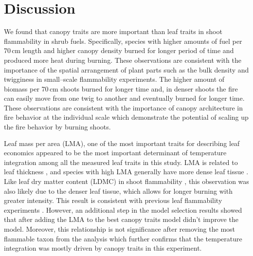 \documentclass{bmcart}
\begin{document}
\section*{Discussion}
We found that canopy traits are more important than leaf traits in shoot flammability in shrub fuels. Specifically, species with higher amounts of fuel per 70\,cm length and higher canopy density burned for longer period of time and produced more heat during burning. These observations are consistent with the importance of the spatial arrangement of plant parts such as the bulk density \citep{pausas2012firesulex} and twigginess \citep{potts2022growth} in small--scale flammability experiments. The higher amount of biomass per 70\,cm shoots burned for longer time and, in denser shoots the fire can easily move from one twig to another and eventually burned for longer time. These observations are consistent with the importance of canopy architecture in fire behavior at the individual scale \citep{schwilk2003flammability, madrigal2012evaluation} which demonstrate the potential of scaling up the fire behavior by burning shoots. 

Leaf mass per area (LMA), one of the most important traits for describing leaf economics \citep{wright2004worldwide} appeared to be the most important determinant of temperature integration among all the measured leaf traits in this study. LMA is related to leaf thickness \citep{niinemets1999research}, and species with high LMA generally have more dense leaf tissue \citep{poorter2009causes}. Like leaf dry matter content (LDMC) in shoot flammability \citep{alam2020shoot, potts2022growth}, this observation was also likely due to the denser leaf tissue, which allows for longer burning with greater intensity. This result is consistent with previous leaf flammability experiments \citep{krix2018landscape}. However, an additional step in the model selection results showed that after adding the LMA to the best canopy traits model didn't improve the model. Moreover, this relationship is not significance after removing the most flammable taxon from the analysis which further confirms that the temperature integration was mostly driven by canopy traits in this experiment.
\end{document}
